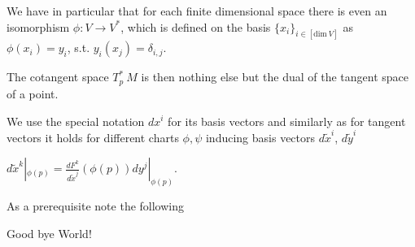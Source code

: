 We have in particular that for each finite dimensional space there is even an isomorphism \(\phi : V \to V^\ast \),
which is defined on the basis \( \{x_i\}_{i \in [\text{dim}\ V]} \) as \( \phi(x_i) = y_i \), s.t. \( y_i(x_j) = \delta_{i,j} \).

The cotangent space \( T^\ast_p\ M \) is then nothing else but the dual of the tangent space of a point.

We use the special notation \( dx^i \) for its basis vectors and similarly as for tangent vectors it holds for different
charts \( \phi, \psi \) inducing basis vectors \( d\tilde{x}^i \), \( d\tilde{y}^i \)

\( d\tilde{x}^k|_{\phi(p)} = \frac{dF^k}{d\tilde{x}^j}(\phi(p))dy^j|_{\phi(p)} \).


As a prerequisite note the following 

Good bye World!